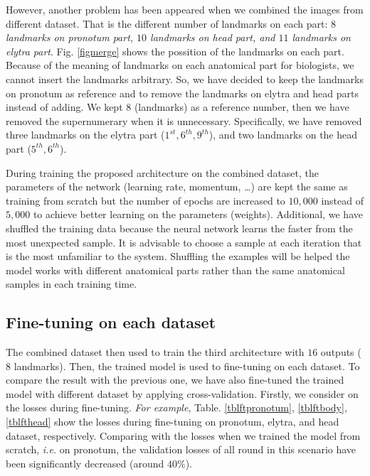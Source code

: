 \documentclass[review]{elsarticle}
\begin{document}
However, another problem has been appeared when we combined the images from different dataset. That is the different number of landmarks on each part: \textit{$8$ landmarks on pronotum part, $10$ landmarks on head part, and $11$ landmarks on elytra part}. Fig. \ref{figmerge} shows the possition of the landmarks on each part. Because of the meaning of landmarks on each anatomical part for biologists, we cannot insert the landmarks arbitrary. So,  we have decided to keep the landmarks on pronotum as reference and to remove the landmarks on elytra and head parts instead of adding. We kept $8$ (landmarks) as a reference number, then we have removed the supernumerary when it is unnecessary. Specifically, we have removed three landmarks on the elytra part ($1^{st}, 6^{th}, 9^{th}$), and two landmarks on the head part ($5^{th}, 6^{th}$). 

During training the proposed architecture on the combined dataset, the parameters of the network (learning rate, momentum, \ldots) are kept the same as training from scratch but the number of epochs are increased to $10, 000$ instead of $5, 000$ to achieve better learning on the parameters (weights). Additional, we have shuffled the training data because the neural network learns the faster from the most unexpected sample. It is advisable to choose a sample at each iteration that is the most unfamiliar to the system. Shuffling the examples will be helped the model works with different anatomical parts rather than the same anatomical samples in each training time.

\subsection{Fine-tuning on each dataset}
The combined dataset then used to train the third architecture with $16$ outputs ($8$ landmarks). Then, the trained model is used to fine-tuning on each dataset. To compare the result with the previous one, we have also fine-tuned the trained model with different dataset by applying cross-validation. Firstly, we consider on the losses during fine-tuning. \textit{For example}, Table. \ref{tblftpronotum}, \ref{tblftbody}, \ref{tblfthead} show the losses during fine-tuning on pronotum, elytra, and head dataset, respectively. Comparing with the losses when we trained the model from scratch, \textit{i.e.} on pronotum, the validation losses of all round in this scenario have been significantly decreased (around $40\%$).
\end{document}
